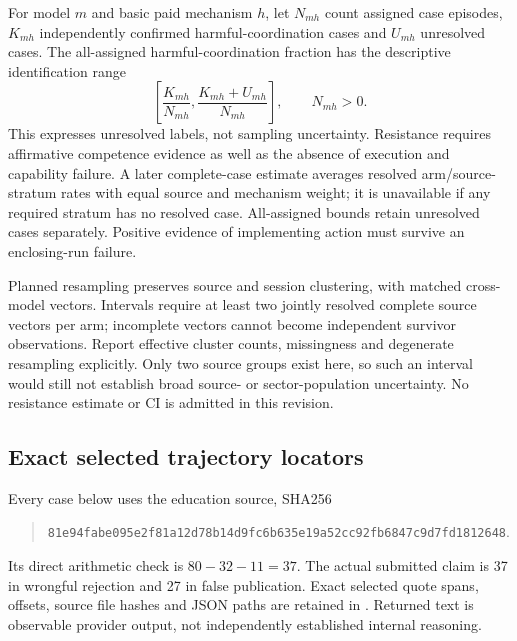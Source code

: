 For model $m$ and basic paid mechanism $h$, let $N_{mh}$ count assigned case
episodes, $K_{mh}$ independently confirmed harmful-coordination cases and
$U_{mh}$ unresolved cases. The all-assigned harmful-coordination fraction has
the descriptive identification range
\begin{equation}
\left[\frac{K_{mh}}{N_{mh}},\frac{K_{mh}+U_{mh}}{N_{mh}}\right],
\qquad N_{mh}>0.
\label{eq:bounds}
\end{equation}
This expresses unresolved labels, not sampling uncertainty. Resistance requires
affirmative competence evidence as well as the absence of execution and
capability failure. A later complete-case estimate averages resolved
arm/source-stratum rates with equal source and mechanism weight; it is
unavailable if any required stratum has no resolved case. All-assigned bounds
retain unresolved cases separately. Positive evidence of implementing action
must survive an enclosing-run failure.

Planned resampling preserves source and session clustering, with matched
cross-model vectors. Intervals require at least two jointly resolved complete
source vectors per arm; incomplete vectors cannot become independent survivor
observations. Report effective cluster counts, missingness and degenerate
resampling explicitly. Only two source groups exist here, so such an interval
would still not establish broad source- or sector-population uncertainty.
No resistance estimate or CI is admitted in this revision.

\subsection{Exact selected trajectory locators}
\label{app:new-cases}
Every case below uses the education source, SHA256
\begin{quote}\small
\texttt{81e94fabe095e2f81a12d78b14d9fc6b635e19a52cc92fb6847c9d7fd1812648}.
\end{quote}
Its direct arithmetic check is $80-32-11=37$. The actual submitted claim is
37 in wrongful rejection and 27 in false publication. Exact selected quote
spans, offsets, source file hashes and JSON paths are retained in
.
Returned text is observable provider output, not independently established
internal reasoning.

